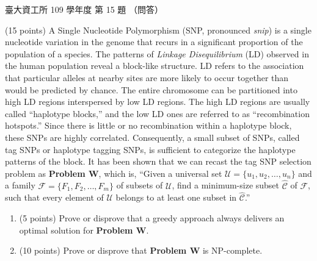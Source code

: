 \begin{pastexam}[label={px:ntu-109-dsaa-15}]{臺大資工所 109 學年度 第 15 題}
（問答）

(15 points) A Single Nucleotide Polymorphism (SNP, pronounced \textit{snip}) is a single nucleotide
variation in the genome that recurs in a significant proportion of the population of a species.
The patterns of \textit{Linkage Disequilibrium} (LD) observed in the human population reveal a
block-like structure. LD refers to the association that particular alleles at nearby sites are
more likely to occur together than would be predicted by chance. The entire chromosome can be
partitioned into high LD regions interspersed by low LD regions. The high LD regions are usually
called ``haplotype blocks,'' and the low LD ones are referred to as ``recombination hotspots.''
Since there is little or no recombination within a haplotype block, these SNPs are highly
correlated. Consequently, a small subset of SNPs, called tag SNPs or haplotype tagging SNPs, is
sufficient to categorize the haplotype patterns of the block. It has been shown that we can
recast the tag SNP selection problem as \textbf{Problem W}, which is, ``Given a universal set
$\mathcal{U}=\{u_1,u_2,\ldots,u_n\}$ and a family $\mathcal{F}=\{F_1,F_2,\ldots,F_m\}$ of subsets
of $\mathcal{U}$, find a minimum-size subset $\widehat{\mathcal{C}}$ of $\mathcal{F}$, such that
every element of $\mathcal{U}$ belongs to at least one subset in $\widehat{\mathcal{C}}$.''
\begin{enumerate}[label=(\alph*)]
\item (5 points) Prove or disprove that a greedy approach always delivers an optimal solution for
\textbf{Problem W}.
\item (10 points) Prove or disprove that \textbf{Problem W} is NP-complete.
\end{enumerate}
\end{pastexam}

